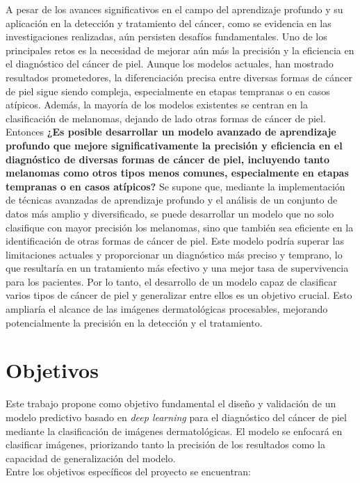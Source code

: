 A pesar de los avances significativos en el campo del aprendizaje profundo y su aplicación en la detección y tratamiento del cáncer, como se evidencia en las investigaciones realizadas, aún persisten desafíos fundamentales. Uno de los principales retos es la necesidad de mejorar aún más la precisión y la eficiencia en el diagnóstico del cáncer de piel. Aunque los modelos actuales, han mostrado resultados prometedores, la diferenciación precisa entre diversas formas de cáncer de piel sigue siendo compleja, especialmente en etapas tempranas o en casos atípicos. Además, la mayoría de los modelos existentes se centran en la clasificación de melanomas, dejando de lado otras formas de cáncer de piel. Entonces \textbf{¿Es posible desarrollar un modelo avanzado de aprendizaje profundo que mejore significativamente la precisión y eficiencia en el diagnóstico de diversas formas de cáncer de piel, incluyendo tanto melanomas como otros tipos menos comunes, especialmente en etapas tempranas o en casos atípicos?} Se supone que, mediante la implementación de técnicas avanzadas de aprendizaje profundo y el análisis de un conjunto de datos más amplio y diversificado, se puede desarrollar un modelo que no solo clasifique con mayor precisión los melanomas, sino que también sea eficiente en la identificación de otras formas de cáncer de piel. Este modelo podría superar las limitaciones actuales y proporcionar un diagnóstico más preciso y temprano, lo que resultaría en un tratamiento más efectivo y una mejor tasa de supervivencia para los pacientes. Por lo tanto, el desarrollo de un modelo capaz de clasificar varios tipos de cáncer de piel y generalizar entre ellos es un objetivo crucial. Esto ampliaría el alcance de las imágenes dermatológicas procesables, mejorando potencialmente la precisión en la detección y el tratamiento.

\section*{Objetivos}

Este trabajo propone como objetivo fundamental el diseño y validación de un modelo predictivo basado en \textit{deep learning} para el diagnóstico del cáncer de piel mediante la clasificación de imágenes dermatológicas. El modelo se enfocará en clasificar imágenes, priorizando tanto la precisión de los resultados como la capacidad de generalización del modelo. \\


Entre los objetivos específicos del proyecto se encuentran:

